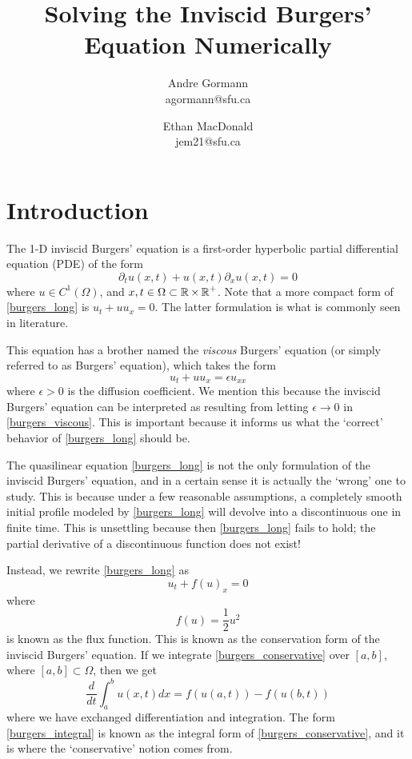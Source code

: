 \documentclass{myproject}
\title{\vspace*{-1cm}Solving the Inviscid Burgers' Equation Numerically}
\date{}
\author{
    Andre Gormann\\
    agormann@sfu.ca
    \and
    Ethan MacDonald\\
    jem21@sfu.ca
}
\begin{document}
\maketitle
\vspace*{-1cm}
\tableofcontents

\section{Introduction}

The 1-D inviscid Burgers' equation is a first-order hyperbolic partial differential equation (PDE) of the form
\begin{equation}\label{burgers_long}
    \partial_t u(x,t) + u(x,t)\partial_xu(x,t) = 0
\end{equation}
where $u \in C^1(\Omega)$, and $x,t \in \Omega \subset \operatorname{\mathbb{R}}\times\operatorname{\mathbb{R}}^+$. Note that a more compact form of \eqref{burgers_long} is $u_t + uu_x = 0$. The latter formulation is what is commonly seen in literature. 

This equation has a brother named the \emph{viscous} Burgers' equation (or simply referred to as Burgers' equation), which takes the form
\begin{equation}\label{burgers_viscous}
    u_t + uu_x = \epsilon u_{xx}
\end{equation}
where $\epsilon > 0$ is the diffusion coefficient. We mention this because the inviscid Burgers' equation can be interpreted as resulting from letting $\epsilon \to 0$ in \eqref{burgers_viscous}. This is important because it informs us what the `correct' behavior of \eqref{burgers_long} should be.

The quasilinear equation \eqref{burgers_long} is not the only formulation of the inviscid Burgers' equation, and in a certain sense it is actually the `wrong' one to study. This is because under a few reasonable assumptions, a completely smooth initial profile modeled by \eqref{burgers_long} will devolve into a discontinuous one in finite time. This is unsettling because then \eqref{burgers_long} fails to hold; the partial derivative of a discontinuous function does not exist!

Instead, we rewrite \eqref{burgers_long} as
\begin{equation}\label{burgers_conservative}
    u_t + f(u)_x = 0
\end{equation}
where
\begin{equation}
    f(u) = \frac{1}{2}u^2
\end{equation}
is known as the flux function. This is known as the conservation form of the inviscid Burgers' equation. If we integrate \eqref{burgers_conservative} over $[a,b]$, where $[a,b] \subset \Omega$, then we get
\begin{equation}\label{burgers_integral}
    \frac{d}{dt}\int_{a}^{b} u(x,t) dx = f(u(a,t)) - f(u(b,t))
\end{equation}
where we have exchanged differentiation and integration. The form \eqref{burgers_integral} is known as the integral form of \eqref{burgers_conservative}, and it is where the `conservative' notion comes from.
\end{document}

